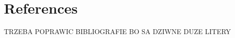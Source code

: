\documentclass[10pt,letterpaper]{article}
\begin{document}
\nolinenumbers

\section*{References}



TRZEBA POPRAWIC BIBLIOGRAFIE BO SA DZIWNE DUZE LITERY

%
%
% 
% 
% 
\end{document}
